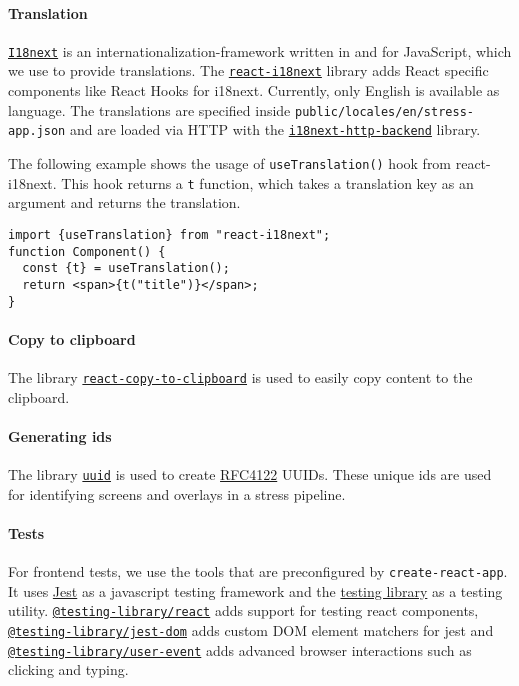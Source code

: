 \paragraph{Translation}
\texttt{\href{https://www.i18next.com}{I18next}} is an internationalization-framework written in and for JavaScript, which we use to provide translations. 
The \texttt{\href{https://react.i18next.com}{react-i18next}} library adds React specific components like React Hooks for i18next. 
Currently, only English is available as language. 
The translations are specified inside \texttt{public/locales/en/stress-app.json} and are loaded via HTTP with the \texttt{\href{https://github.com/i18next/i18next-http-backend}{i18next-http-backend}} library.

The following example shows the usage of \texttt{useTranslation()} hook from react-i18next. 
This hook returns a \texttt{t} function, which takes a translation key as an argument and returns the translation.
\begin{verbatim}
import {useTranslation} from "react-i18next";
function Component() {
  const {t} = useTranslation();
  return <span>{t("title")}</span>;
}
\end{verbatim}

\paragraph{Copy to clipboard}
The library \texttt{\href{https://github.com/nkbt/react-copy-to-clipboard}{react-copy-to-clipboard}} is used to easily copy content to the clipboard.

\paragraph{Generating ids}
The library \texttt{\href{https://github.com/uuidjs/uuid}{uuid}} is used to create \href{https://www.ietf.org/rfc/rfc4122.txt}{RFC4122} UUIDs. 
These unique ids are used for identifying screens and overlays in a stress pipeline.

\paragraph{Tests}
For frontend tests, we use the tools that are preconfigured by \texttt{create-react-app}. 
It uses \href{https://jestjs.io/}{Jest} as a javascript testing framework and the \href{https://testing-library.com}{testing library} as a testing utility. 
\texttt{\href{https://www.npmjs.com/package/@testing-library/react}{@testing-library/react}} adds support for testing react components, 
\texttt{\href{https://www.npmjs.com/package/@testing-library/jest-dom}{@testing-library/jest-dom}} adds custom DOM element matchers for jest and 
\texttt{\href{https://www.npmjs.com/package/@testing-library/user-event}{@testing-library/user-event}} adds advanced browser interactions such as clicking and typing.

